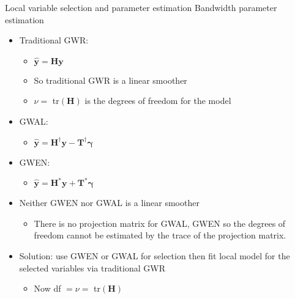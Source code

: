 \documentclass[12pt,t]{beamer}
\newcommand{\subt}[1]{{\footnotesize \color{subtitle} {#1}}}
\begin{document}
\begin{comment}
\begin{frame}{Local variable selection and  parameter estimation}
\subt{Bandwidth parameter estimation}

\bigskip
Letting $H_i = \bm{W}_i \bm{X}\left(\bm{X}'\bm{W}_i\bm{X}\right)^{-1}\bm{X}'$, where $\bm{W}_i$ is the diagonal weight matrix diag$(w_{ii'})$,
 
\begin{align*}
  \hat{\bm{y}} = \bm{H} \bm{y}
\end{align*}

\note{note}
\end{frame}
\end{comment}



\begin{frame}{Local variable selection and  parameter estimation}
\subt{Bandwidth parameter estimation}

\bigskip 
\begin{itemize}
  \item Traditional GWR:
  \begin{itemize}
    \item $\hat{\bm{y}} = \bm{H} \bm{y}$
    \item So traditional GWR is a linear smoother
    \item $\nu = $ tr$(\bm{H})$ is the degrees of freedom for the model
  \end{itemize}
  \item GWAL:
  \begin{itemize}
    \item $\hat{\bm{y}} = \bm{H}^{\dagger}\bm{y} - \bm{T}^{\dagger}\bm{\gamma}$
  \end{itemize}  
  \item GWEN:
  \begin{itemize}
    \item $\hat{\bm{y}} = \bm{H}^{*}\bm{y} + \bm{T}^{*}\bm{\gamma}$
  \end{itemize}  
  \item Neither GWEN nor GWAL is a linear smoother
  \begin{itemize}
    \item There is no projection matrix for GWAL, GWEN so the degrees of freedom cannot be estimated by the trace of the projection matrix.
  \end{itemize} 
  \item Solution: use GWEN or GWAL for selection then fit local model for the selected variables via traditional GWR
  \begin{itemize}
    \item Now df $= \nu = $ tr$(\bm{H})$
  \end{itemize} 
\end{itemize}

\end{frame}
\end{document}
